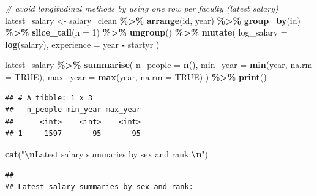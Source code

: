 \documentclass[
]{article}
\newenvironment{Shaded}{\begin{snugshade}}{\end{snugshade}}
\newcommand{\AttributeTok}[1]{\textcolor[rgb]{0.13,0.29,0.53}{#1}}
\newcommand{\CommentTok}[1]{\textcolor[rgb]{0.56,0.35,0.01}{\textit{#1}}}
\newcommand{\ConstantTok}[1]{\textcolor[rgb]{0.56,0.35,0.01}{#1}}
\newcommand{\DecValTok}[1]{\textcolor[rgb]{0.00,0.00,0.81}{#1}}
\newcommand{\FunctionTok}[1]{\textcolor[rgb]{0.13,0.29,0.53}{\textbf{#1}}}
\newcommand{\NormalTok}[1]{#1}
\newcommand{\OtherTok}[1]{\textcolor[rgb]{0.56,0.35,0.01}{#1}}
\newcommand{\SpecialCharTok}[1]{\textcolor[rgb]{0.81,0.36,0.00}{\textbf{#1}}}
\newcommand{\StringTok}[1]{\textcolor[rgb]{0.31,0.60,0.02}{#1}}
\begin{document}
\begin{Shaded}
\begin{Highlighting}[]
\CommentTok{\# avoid longitudinal methods by using one row per faculty (latest salary)}
\NormalTok{latest\_salary }\OtherTok{\textless{}{-}}\NormalTok{ salary\_clean }\SpecialCharTok{\%\textgreater{}\%}
  \FunctionTok{arrange}\NormalTok{(id, year) }\SpecialCharTok{\%\textgreater{}\%}
  \FunctionTok{group\_by}\NormalTok{(id) }\SpecialCharTok{\%\textgreater{}\%}
  \FunctionTok{slice\_tail}\NormalTok{(}\AttributeTok{n =} \DecValTok{1}\NormalTok{) }\SpecialCharTok{\%\textgreater{}\%}
  \FunctionTok{ungroup}\NormalTok{() }\SpecialCharTok{\%\textgreater{}\%}
  \FunctionTok{mutate}\NormalTok{(}
    \AttributeTok{log\_salary =} \FunctionTok{log}\NormalTok{(salary),}
    \AttributeTok{experience =}\NormalTok{ year }\SpecialCharTok{{-}}\NormalTok{ startyr}
\NormalTok{  )}

\NormalTok{latest\_salary }\SpecialCharTok{\%\textgreater{}\%}
  \FunctionTok{summarise}\NormalTok{(}
    \AttributeTok{n\_people =} \FunctionTok{n}\NormalTok{(),}
    \AttributeTok{min\_year =} \FunctionTok{min}\NormalTok{(year, }\AttributeTok{na.rm =} \ConstantTok{TRUE}\NormalTok{),}
    \AttributeTok{max\_year =} \FunctionTok{max}\NormalTok{(year, }\AttributeTok{na.rm =} \ConstantTok{TRUE}\NormalTok{)}
\NormalTok{  ) }\SpecialCharTok{\%\textgreater{}\%}
  \FunctionTok{print}\NormalTok{()}
\end{Highlighting}
\end{Shaded}

\begin{verbatim}
## # A tibble: 1 x 3
##   n_people min_year max_year
##      <int>    <int>    <int>
## 1     1597       95       95
\end{verbatim}

\begin{Shaded}
\begin{Highlighting}[]
\FunctionTok{cat}\NormalTok{(}\StringTok{"}\SpecialCharTok{\textbackslash{}n}\StringTok{Latest salary summaries by sex and rank:}\SpecialCharTok{\textbackslash{}n}\StringTok{"}\NormalTok{)}
\end{Highlighting}
\end{Shaded}

\begin{verbatim}
## 
## Latest salary summaries by sex and rank:
\end{verbatim}
\end{document}
